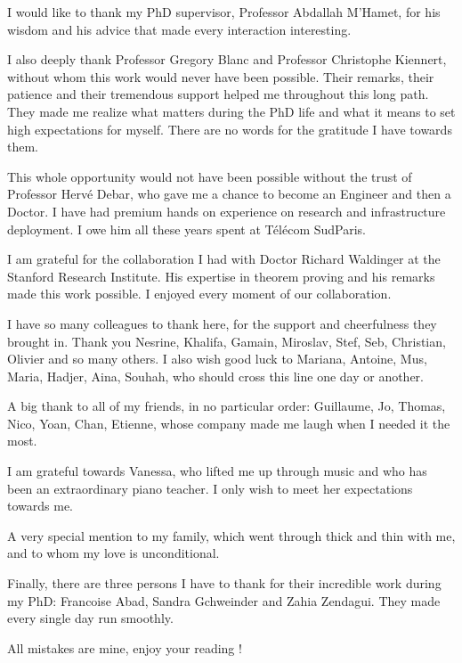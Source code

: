 \documentclass[a4paper, 11pt]{report}
\theoremstyle{definition}
\begin{document}
I would like to thank my PhD supervisor, Professor Abdallah M'Hamet, for his wisdom and his advice that made every interaction interesting.

I also deeply thank Professor Gregory Blanc and Professor Christophe Kiennert, without whom this work 
would never have been possible. Their remarks, their patience and their tremendous support helped me throughout this long path. They made me realize what matters during the PhD life and what it means to set high expectations for myself. There are no words for the gratitude I have towards them.

This whole opportunity would not have been possible without the trust of Professor Herv\'e Debar, who gave me a chance to become an Engineer and then a Doctor. I have had premium hands on experience on research and infrastructure deployment. I owe him all these years spent at T\'el\'ecom SudParis.

I am grateful for the collaboration I had with Doctor Richard Waldinger at the Stanford Research Institute. His expertise in theorem proving and his remarks made this work possible. I enjoyed every moment of our collaboration.

I have so many colleagues to thank here, for the support and cheerfulness they brought in.
Thank you Nesrine, Khalifa, Gamain, Miroslav, Stef, Seb, Christian, Olivier and so many others. I also wish good luck to Mariana, Antoine, Mus, Maria, Hadjer, Aina, Souhah, who should cross this line one day or another.

A big thank to all of my friends, in no particular order: Guillaume, Jo, Thomas, Nico, Yoan, Chan, Etienne, whose company made me laugh when I needed it the most. 

I am grateful towards Vanessa, who lifted me up through music and who has been an extraordinary piano teacher. I only wish to meet her expectations towards me.

A very special mention to my family, which went through thick and thin with me, and to whom my love is unconditional. 

Finally, there are three persons I have to thank for their incredible work during my PhD: Francoise Abad, Sandra Gchweinder and Zahia Zendagui. They made every single day run smoothly.

All mistakes are mine, enjoy your reading !

\newpage

\tableofcontents
\listoffigures
 \listoftables
\thispagestyle{empty}
\end{document}
